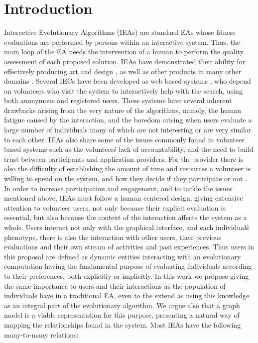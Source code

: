 \documentclass[conference]{IEEEtran}
\begin{document}
\IEEEpeerreviewmaketitle



\section{Introduction}
Interactive Evolutionary Algorithms (IEAs) are standard EAs whose
fitness evaluations are performed by persons within an interactive 
system.  Thus, the main loop of the EA needs the intervention of a
human to perform the quality assessment of each proposed solution.
IEAs have demonstrated their ability for effectively
producing art and design \cite{Bentley:1999:intro,Sims:1991,todd:1992},
as well as other products in many other domains \cite{ie1}. 
Several IECs have been developed as web based systems \cite{picbreeder},
who depend on volunteers who visit the system to interactively help
with the search, using both anonymous and registered users.
These systems have several inherent drawbacks arising from the very nature of 
the algorithms, namely, the human fatigue caused by the interaction, and
the boredom arising when users evaluate a large number of individuals 
many of which are not interesting or are very similar to each other.
IEAs also share some of the issues commonly found in volunteer based systems
\cite{sarmenta2001volunteer,web:BOINC} such as the volunteer\'s lack of accountability,
and the need to build trust between participants and application providers. 
For the provider there is also the difficulty of establishing 
the amount of time and resources
a volunteer is willing to spend on the system, and how they decide if they
participate or not \cite{JJ:2016}. In order to increase participation and 
engagement, and to tackle the issues mentioned above,  
IEAs must follow a human centered design, giving extensive attention 
to volunteer users, not only because their
explicit evaluation is essential, but also because the context of the 
interaction affects the system as a whole. Users interact not only with the graphical
interface, and each individual\'s phenotype, there is also the interaction
with other users, their previous evaluations and their own stream of activities
and past experiences. Thus users in this proposal are defined as dynamic entities 
interacting with an evolutionary computation having the fundamental purpose 
of evaluating individuals according to their preferences,
both explicitly or implicitly. In this work we propose giving the same
importance to users and their interactions as the population of 
individuals have in a traditional EA, even to the extend as using this
knowledge as an integral part of the evolutionary algorithm. We argue also
that a graph model is a viable representation for this purpose,  
presenting a natural way of mapping the relationships found in the system. 
Most IEAs have the following many-to-many relations:
\end{document}
